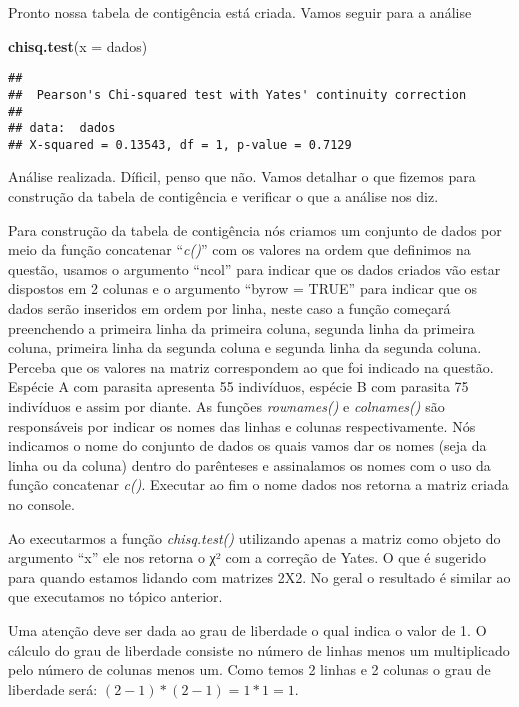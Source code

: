 \documentclass[]{book}
\newenvironment{Shaded}{\begin{snugshade}}{\end{snugshade}}
\newcommand{\DataTypeTok}[1]{\textcolor[rgb]{0.13,0.29,0.53}{#1}}
\newcommand{\KeywordTok}[1]{\textcolor[rgb]{0.13,0.29,0.53}{\textbf{#1}}}
\newcommand{\NormalTok}[1]{#1}
\begin{document}
Pronto nossa tabela de contigência está criada. Vamos seguir para a análise

\begin{Shaded}
\begin{Highlighting}[]
\KeywordTok{chisq.test}\NormalTok{(}\DataTypeTok{x =}\NormalTok{ dados)}
\end{Highlighting}
\end{Shaded}

\begin{verbatim}
## 
##  Pearson's Chi-squared test with Yates' continuity correction
## 
## data:  dados
## X-squared = 0.13543, df = 1, p-value = 0.7129
\end{verbatim}

Análise realizada. Díficil, penso que não. Vamos detalhar o que fizemos para construção da tabela de contigência e verificar o que a análise nos diz.

Para construção da tabela de contigência nós criamos um conjunto de dados por meio da função concatenar ``\emph{c()}'' com os valores na ordem que definimos na questão, usamos o argumento ``ncol'' para indicar que os dados criados vão estar dispostos em 2 colunas e o argumento ``byrow = TRUE'' para indicar que os dados serão inseridos em ordem por linha, neste caso a função começará preenchendo a primeira linha da primeira coluna, segunda linha da primeira coluna, primeira linha da segunda coluna e segunda linha da segunda coluna. Perceba que os valores na matriz correspondem ao que foi indicado na questão. Espécie A com parasita apresenta 55 indivíduos, espécie B com parasita 75 indivíduos e assim por diante. As funções \emph{rownames()} e \emph{colnames()} são responsáveis por indicar os nomes das linhas e colunas respectivamente. Nós indicamos o nome do conjunto de dados os quais vamos dar os nomes (seja da linha ou da coluna) dentro do parênteses e assinalamos os nomes com o uso da função concatenar \emph{c()}. Executar ao fim o nome dados nos retorna a matriz criada no console.

Ao executarmos a função \emph{chisq.test()} utilizando apenas a matriz como objeto do argumento ``x'' ele nos retorna o χ² com a correção de Yates. O que é sugerido para quando estamos lidando com matrizes 2X2. No geral o resultado é similar ao que executamos no tópico anterior.

Uma atenção deve ser dada ao grau de liberdade o qual indica o valor de 1. O cálculo do grau de liberdade consiste no número de linhas menos um multiplicado pelo número de colunas menos um. Como temos 2 linhas e 2 colunas o grau de liberdade será: \((2-1)*(2-1) = 1*1 = 1\).
\end{document}
